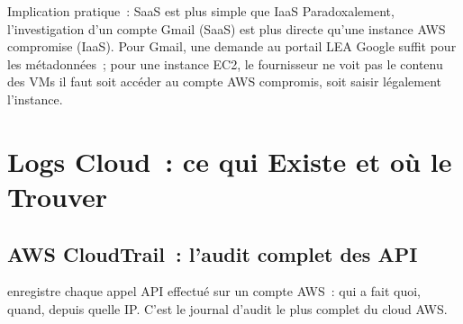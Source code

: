 \begin{boiteRemarque}{Implication pratique~: SaaS est plus simple que IaaS}
Paradoxalement, l'investigation d'un compte Gmail (SaaS) est plus
directe qu'une instance AWS compromise (IaaS). Pour Gmail, une demande
au portail LEA Google suffit pour les métadonnées~; pour une instance
EC2, le fournisseur ne voit pas le contenu des VMs il faut soit
accéder au compte AWS compromis, soit saisir légalement l'instance.
\end{boiteRemarque}

\section{Logs Cloud~: ce qui Existe et où le Trouver}
\label{sec:logs-cloud}

\subsection{AWS CloudTrail~: l'audit complet des API}

 enregistre chaque appel API
effectué sur un compte AWS~: qui a fait quoi, quand, depuis quelle IP.
C'est le journal d'audit le plus complet du cloud AWS.

